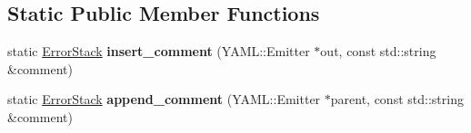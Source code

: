 \subsection*{Static Public Member Functions}
\begin{DoxyCompactItemize}
\item 
static \hyperlink{classalps_1_1ErrorStack}{Error\+Stack} {\bfseries insert\+\_\+comment} (Y\+A\+M\+L\+::\+Emitter $\ast$out, const std\+::string \&comment)\hypertarget{structalps_1_1Externalizable_a28dd65d2a42ab29bd43e558068823724}{}\label{structalps_1_1Externalizable_a28dd65d2a42ab29bd43e558068823724}

\item 
static \hyperlink{classalps_1_1ErrorStack}{Error\+Stack} {\bfseries append\+\_\+comment} (Y\+A\+M\+L\+::\+Emitter $\ast$parent, const std\+::string \&comment)\hypertarget{structalps_1_1Externalizable_acc02665189c05b0bb47cfb47f6cc158f}{}\label{structalps_1_1Externalizable_acc02665189c05b0bb47cfb47f6cc158f}


\end{DoxyCompactItemize}
